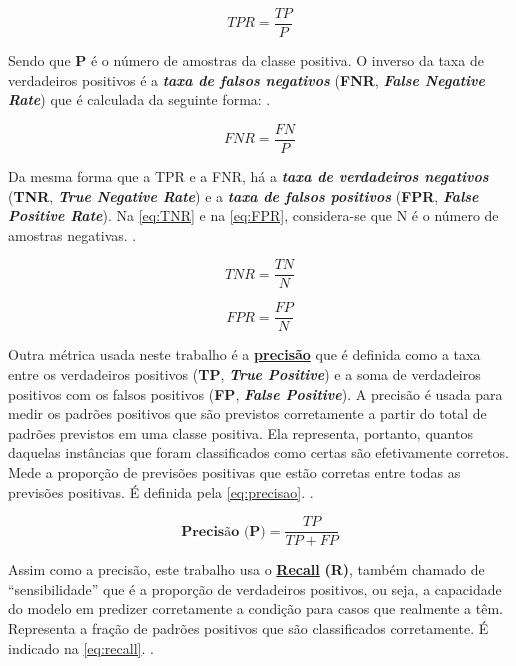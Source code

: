 \begin{equation}\label{eq:TPR}
TPR = \frac{TP}{P}
\end{equation}

Sendo que $\textbf{P}$ é o número de amostras da classe positiva. O inverso da taxa de verdadeiros positivos é a \textbf{\textit{taxa de falsos negativos}} (\textbf{FNR}, \textbf{\textit{False Negative Rate}}) que é calculada da seguinte forma: \cite{klosterman_projetos_2020, hossin_review_2015}.

\begin{equation}\label{eq:FNR}
FNR = \frac{FN}{P}
\end{equation}

Da mesma forma que a TPR e a FNR, há a \textbf{\textit{taxa de verdadeiros negativos}} (\textbf{TNR}, \textbf{\textit{True Negative Rate}}) e a \textbf{\textit{taxa de falsos positivos}} (\textbf{FPR}, \textbf{\textit{False Positive Rate}}). Na \autoref{eq:TNR} e na \autoref{eq:FPR}, considera-se que N é o número de amostras negativas. \cite{klosterman_projetos_2020} \cite{hossin_review_2015}.

\begin{equation}\label{eq:TNR}
TNR = \frac{TN}{N}
\end{equation}

\begin{equation}\label{eq:FPR}
FPR = \frac{FP}{N}
\end{equation}

Outra métrica usada neste trabalho é a \textbf{\underline{precisão}} que é definida como a taxa entre os verdadeiros positivos (\textbf{TP}, \textit{\textbf{True Positive}}) e a soma de verdadeiros positivos com os falsos positivos (\textbf{FP}, \textbf{\textit{False Positive}}). A precisão é usada para medir os padrões positivos que são previstos corretamente a partir do total de padrões previstos em uma classe positiva. Ela representa, portanto, quantos daquelas instâncias que foram classificados como certas são efetivamente corretos. Mede a proporção de previsões positivas que estão corretas entre todas as previsões positivas. É definida pela \autoref{eq:precisao}. \cite{hossin_review_2015}.

\begin{equation}\label{eq:precisao}
\textbf{Precisão (P)} = \frac{TP}{TP + FP}
\end{equation}

Assim como a precisão, este trabalho usa o \textbf{\underline{Recall}} \textbf{(R)}, também chamado de ``sensibilidade'' que é a proporção de verdadeiros positivos, ou seja, a capacidade do modelo em predizer corretamente a condição para casos que realmente a têm. Representa a fração de padrões positivos que são classificados corretamente. É indicado na \autoref{eq:recall}. \cite{hossin_review_2015}.

